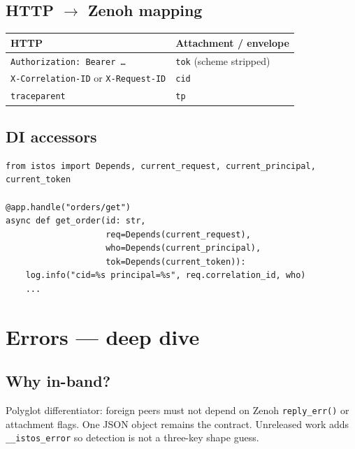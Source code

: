 \documentclass[11pt,a4paper]{article}
\begin{document}
\subsection{HTTP $\to$ Zenoh mapping}

\begin{center}
\begin{tabular}{@{}ll@{}}
\toprule
HTTP & Attachment / envelope \\
\midrule
\texttt{Authorization: Bearer \ldots} & \texttt{tok} (scheme stripped) \\
\texttt{X-Correlation-ID} or \texttt{X-Request-ID} & \texttt{cid} \\
\texttt{traceparent} & \texttt{tp} \\
\bottomrule
\end{tabular}
\end{center}

\subsection{DI accessors}

\begin{lstlisting}
from istos import Depends, current_request, current_principal, current_token

@app.handle("orders/get")
async def get_order(id: str,
                    req=Depends(current_request),
                    who=Depends(current_principal),
                    tok=Depends(current_token)):
    log.info("cid=%s principal=%s", req.correlation_id, who)
    ...
\end{lstlisting}

\section{Errors --- deep dive}
\label{sec:errors}

\subsection{Why in-band?}

Polyglot differentiator: foreign peers must not depend on Zenoh
\texttt{reply\_err()} or attachment flags. One JSON object remains the contract.
Unreleased work adds \texttt{\_\_istos\_error} so detection is not a three-key
shape guess.
\end{document}
